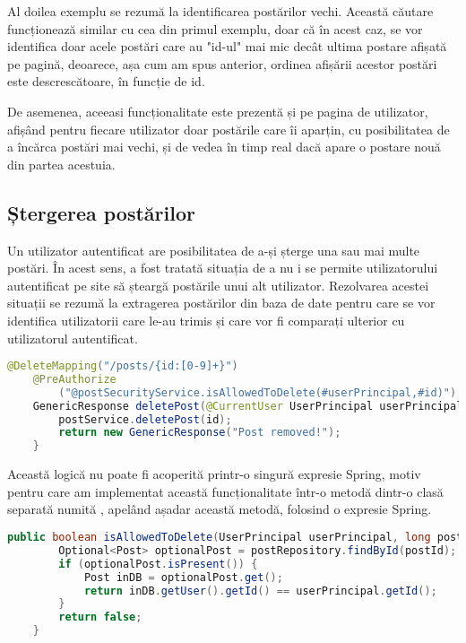 Al doilea exemplu se rezumă la identificarea postărilor vechi. Această căutare funcționează similar cu cea din primul exemplu, doar că în acest caz, se vor identifica doar acele postări care au "id-ul" mai mic decât ultima postare afișată pe pagină, deoarece, așa cum am spus anterior, ordinea afișării acestor postări este descrescătoare, în funcție de id.\newline

De asemenea, aceeasi funcționalitate este prezentă și pe pagina de utilizator, afișând pentru fiecare utilizator doar postările care îi aparțin, cu posibilitatea de a încărca postări mai vechi, și de vedea în timp real dacă apare o postare nouă din partea acestuia.\newline

\subsection{Ștergerea postărilor}

Un utilizator autentificat are posibilitatea de a-și șterge una sau mai multe postări. În acest sens, a fost tratată situația de a nu i se permite utilizatorului autentificat pe site să șteargă postările unui alt utilizator. Rezolvarea acestei situații se rezumă la extragerea postărilor din baza de date pentru care se vor identifica utilizatorii care le-au trimis și care vor fi comparați ulterior cu utilizatorul autentificat.\newline

\begin{lstlisting}[language=Java]
	@DeleteMapping("/posts/{id:[0-9]+}")
	@PreAuthorize
		("@postSecurityService.isAllowedToDelete(#userPrincipal,#id)")
	GenericResponse deletePost(@CurrentUser UserPrincipal userPrincipal, @PathVariable long id) {
		postService.deletePost(id);
		return new GenericResponse("Post removed!");
	}
\end{lstlisting}
\bigskip

Această logică nu poate fi acoperită printr-o singură expresie Spring, motiv pentru care am implementat această funcționalitate într-o metodă dintr-o clasă separată numită , apelând așadar această metodă, folosind o expresie Spring.\newline

\begin{lstlisting}[language=Java]
	public boolean isAllowedToDelete(UserPrincipal userPrincipal, long postId) {
		Optional<Post> optionalPost = postRepository.findById(postId);
		if (optionalPost.isPresent()) {
			Post inDB = optionalPost.get();
			return inDB.getUser().getId() == userPrincipal.getId();
		}
		return false;
	}
\end{lstlisting}
\bigskip

